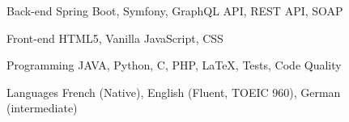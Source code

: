 

\begin{cvskills}

\cvskill
  {Back-end} %
  {Spring Boot, Symfony, GraphQL API, REST API, SOAP} %

  \cvskill
    {Front-end} %
    {HTML5, Vanilla JavaScript, CSS} %

  \cvskill
    {Programming} %
    {JAVA, Python, C, PHP, LaTeX, Tests, Code Quality} %

  \cvskill
    {Languages} %
    {French (Native), English (Fluent, TOEIC 960), German (intermediate)} %

\end{cvskills}
